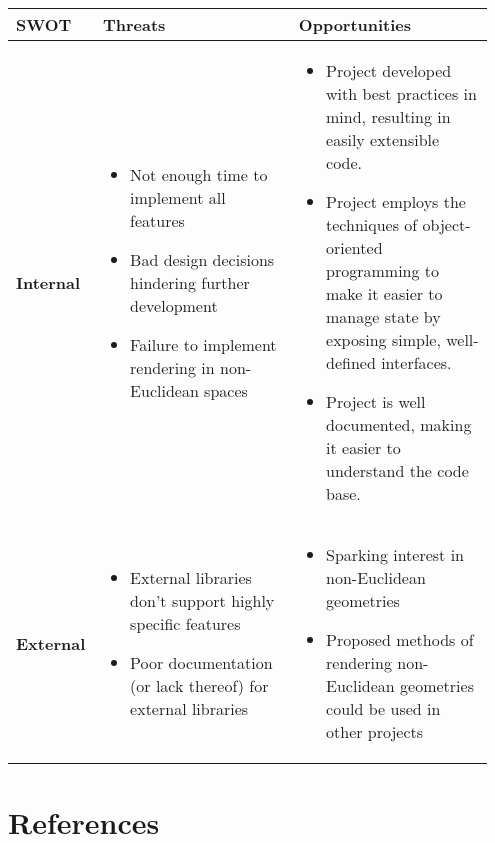 \documentclass[12pt]{article}
\begin{document}
\begin{table}[H]
    \centering
    \begin{tabular}{|p{0.15\linewidth}|p{0.4\linewidth}|p{0.4\linewidth}|}
        \hline
        \textbf{SWOT} & \textbf{Threats}                                                                             & \textbf{Opportunities} \\ \hline
        \textbf{Internal}
                      & \begin{itemize}
                            \itemsep0em
                            \item Not enough time to implement all features
                            \item Bad design decisions hindering further development
                            \item Failure to implement rendering in non-Euclidean spaces
                        \end{itemize}
                      &
        \begin{itemize}
            \itemsep0em
            \item Project developed with best practices in mind, resulting in easily extensible code.
            \item Project employs the techniques of object-oriented programming to make it easier to manage state by exposing simple, well-defined interfaces.
            \item Project is well documented, making it easier to understand the code base.
        \end{itemize}
        \\ \hline
        \textbf{External}
                      &
        \begin{itemize}
            \itemsep0em
            \item External libraries don't support highly specific features
            \item Poor documentation (or lack thereof) for external libraries
        \end{itemize}
                      & \begin{itemize}
                            \itemsep0em
                            \item Sparking interest in non-Euclidean geometries
                            \item Proposed methods of rendering non-Euclidean geometries could be used in other projects
                        \end{itemize}                           \\  \hline
    \end{tabular}

\end{table}

\newpage
\section{References}
\printbibliography
\end{document}
